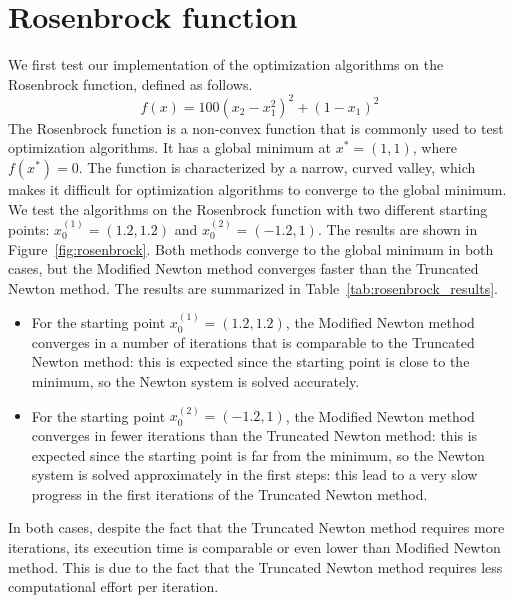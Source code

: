 \section{Rosenbrock function}
\label{sec:rosenbrock_results}

We first test our implementation of the optimization algorithms on the Rosenbrock function, defined as follows.
\begin{equation}
    f(x) = 100(x_2 - x_1^2)^2 + (1 - x_1)^2
\end{equation}
The Rosenbrock function is a non-convex function that is commonly used to test optimization algorithms. It has a global minimum at $x^* = (1, 1)$, where $f(x^*) = 0$. The function is characterized by a narrow, curved valley, which makes it difficult for optimization algorithms to converge to the global minimum.
We test the algorithms on the Rosenbrock function with two different starting points: $x_0^{(1)} = (1.2, 1.2)$ and $x_0^{(2)} = (-1.2, 1)$. The results are shown in Figure~\ref{fig:rosenbrock}.
Both methods converge to the global minimum in both cases, but the Modified Newton method converges faster than the Truncated Newton method. The results are summarized in Table~\ref{tab:rosenbrock_results}.
\begin{itemize}
    \item For the starting point $x_0^{(1)} = (1.2, 1.2)$, the Modified Newton method converges in a number of iterations that is comparable to the Truncated Newton method: this is expected since the starting point is close to the minimum, so the Newton system is solved accurately.
    \item For the starting point $x_0^{(2)} = (-1.2, 1)$, the Modified Newton method converges in fewer iterations than the Truncated Newton method: this is expected since the starting point is far from the minimum, so the Newton system is solved approximately in the first steps: this lead to a very slow progress in the first iterations of the Truncated Newton method.
\end{itemize}
In both cases, despite the fact that the Truncated Newton method requires more iterations, its execution time is comparable or even lower than Modified Newton method.
This is due to the fact that the Truncated Newton method requires less computational effort per iteration.
